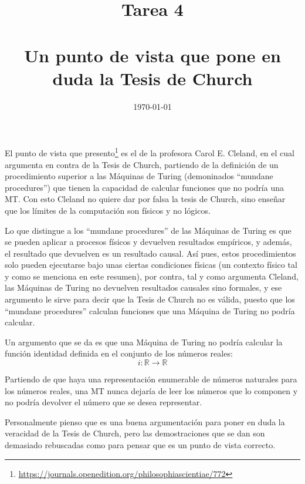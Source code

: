 \documentclass[11pt, a4paper, titlepage]{article}
\begin{document}
\title{Tarea 4 \\
  \\
  \large Un punto de vista que pone en duda la Tesis de Church}
\subtitle{}
\date{\today}
\maketitle

\newpage

El punto de vista que presento\footnote{\url{https://journals.openedition.org/philosophiascientiae/772}}
es el de la profesora Carol E. Cleland, en el cual argumenta en contra de la
Tesis de Church, partiendo de la definición de un procedimiento superior a las
Máquinas de Turing (demoninados ``mundane procedures'') que tienen la capacidad
de calcular funciones que no podría una MT. Con esto Cleland no quiere dar por
falsa la tesis de Church, sino enseñar que los límites de la computación son
físicos y no lógicos.

Lo que distingue a los ``mundane procedures'' de las Máquinas de Turing es que se
pueden aplicar a procesos físicos y devuelven resultados empíricos, y además, el
resultado que devuelven es un resultado causal. Así pues, estos procedimientos
solo pueden ejecutarse bajo unas ciertas condiciones físicas (un contexto físico
tal y como se menciona en este resumen), por contra, tal y como argumenta Cleland,
las Máquinas de Turing no devuelven resultados causales sino formales, y ese
argumento le sirve para decir que la Tesis de Church no es válida, puesto
que los ``mundane procedures'' calculan funciones que una Máquina de Turing no podría
calcular.

Un argumento que se da es que una Máquina de Turing no podría calcular la función
identidad definida en el conjunto de los números reales:\\
\begin{equation}
  i \colon \mathbb{R} \to \mathbb{R}
\end{equation}

Partiendo de que haya una representación enumerable de números naturales para los
números reales, una MT nunca dejaría de leer los números que lo componen y no podría
devolver el número que se desea representar.


Personalmente pienso que es una buena argumentación para poner en duda la veracidad
de la Tesis de Church, pero las demostraciones que se dan son demasiado rebuscadas
como para pensar que es un punto de vista correcto.
\end{document}
